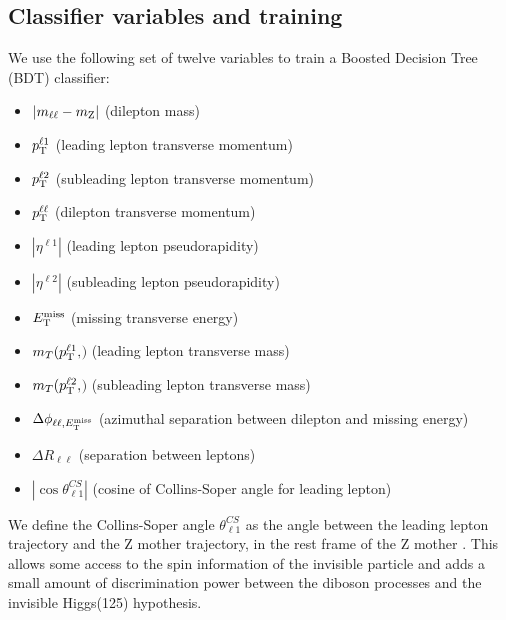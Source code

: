 \subsection{Classifier variables and training} 

We use the following set of twelve variables to train a Boosted Decision Tree (BDT) classifier: 
\begin{itemize}
\item  $\left|m_{\ell\ell}-m_{\mathrm{Z}}\right|$ (dilepton mass) 
\item $p_{\mathrm{T}}^{\ell 1}$ (leading lepton transverse momentum) 
\item $p_{\mathrm{T}}^{\ell 2}$ (subleading lepton transverse momentum)
\item $p_{\mathrm{T}}^{\ell\ell}$ (dilepton transverse momentum)
\item $| \eta^{\ell 1} |$ (leading lepton pseudorapidity)
\item $| \eta^{\ell 2} |$ (subleading lepton pseudorapidity)
\item $E_\mathrm{T}^{\mathrm{miss}}$       (missing transverse energy)
\item $m_{T}(p_{\mathrm{T}}^{\ell 1}, $\met$)$ (leading lepton transverse mass)
\item $m_{T}(p_{\mathrm{T}}^{\ell 2}, $\met$)$ (subleading lepton transverse mass)
\item $\Delta \phi_{\ell\ell,E_\mathrm{T}^{\mathrm{miss}}}$ (azimuthal separation between dilepton and missing energy) 
\item $\Delta R_{\ell\ell}$ (separation between leptons)
\item $| \cos \theta^{CS}_{\ell1} |$ (cosine of Collins-Soper angle for leading lepton)
\end{itemize}

We define the Collins-Soper angle $\theta^{CS}_{\ell1}$ as the angle between the leading lepton trajectory and the Z mother trajectory, in the rest frame of the Z mother \cite{Collins:1984kg}.
This allows some access to the spin information of the invisible particle and adds a small amount of discrimination power between the diboson processes and the invisible Higgs(125) hypothesis.

